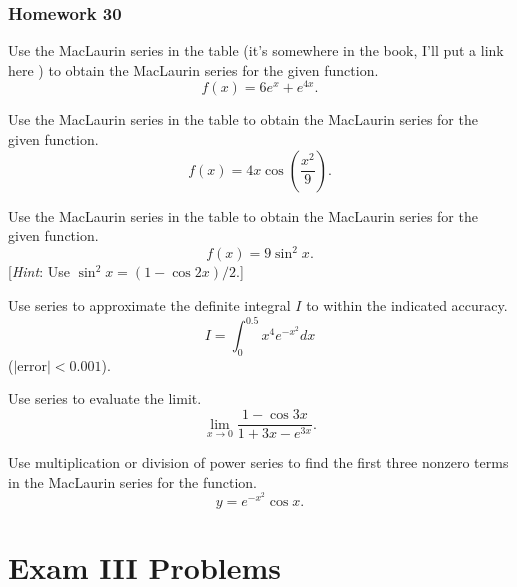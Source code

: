 \subsection{Homework 30}
\begin{problem}[WebAssign HW 30, \# 1]
Use the MacLaurin series in the table (it's somewhere in the book, I'll put
a link here ) to obtain the MacLaurin series for the given function.
\[
f(x)=6e^x+e^{4x}.
\]
\end{problem}

\begin{problem}[WebAssign HW 30, \# 2]
Use the MacLaurin series in the table to obtain the MacLaurin series for
the given function.
\[
f(x)=4x\cos\left(\frac{x^2}{9}\right).
\]
\end{problem}

\begin{problem}[WebAssign HW 30, \# 3]
Use the MacLaurin series in the table to obtain the MacLaurin series for
the given function.
\[
f(x)=9\sin^2 x.
\]
[\emph{Hint}: Use $\sin^2 x=(1-\cos 2x)/2$.]
\end{problem}

\begin{problem}[WebAssign HW 30, \# 4]
Use series to approximate the definite integral $I$ to within the indicated
accuracy.
\[
I=\int_0^{0.5} x^4 e^{-x^2}dx
\]
($|\mathrm{error}|<0.001$).
\end{problem}

\begin{problem}[WebAssign HW 30, \# 5]
Use series to evaluate the limit.
\[
\lim_{x\to 0}\frac{1-\cos 3x}{1+3x-e^{3x}}.
\]
\end{problem}

\begin{problem}[WebAssign HW 30, \# 6]
Use multiplication or division of power series to find the first three
nonzero terms in the MacLaurin series for the function.
\[
y=e^{-x^2}\cos x.
\]
\end{problem}
\newpage
\chapter{Exam III Problems}

